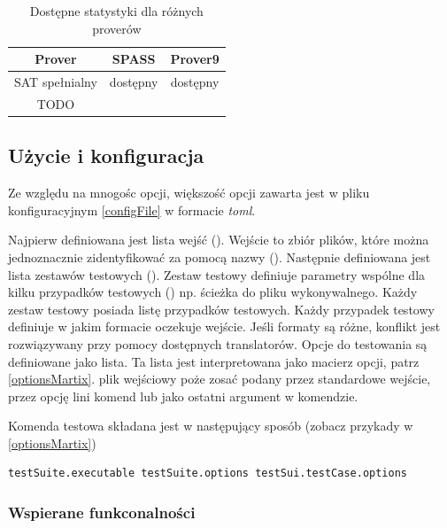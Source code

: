 \documentclass[a4paper,12pt]{article}
\begin{document}
\begin{table}[ht]
  \centering
  \caption{Dostępne statystyki dla różnych proverów}
  \begin{tabular}{ |c|c|c| }
    \hline
    Prover & SPASS & Prover9 \\
    \hline
    SAT spełnialny & dostępny & dostępny \\
    \hline
    TODO & & \\
    \hline
  \end{tabular}
\end{table}

\subsection{Użycie i konfiguracja} \label{benchmarkUsage}

Ze względu na mnogośc opcji, większość opcji zawarta jest w pliku konfiguracyjnym \ref{configFile} w formacie \textit{toml}.

Najpierw definiowana jest lista wejść (). Wejście to zbiór plików, które można jednoznacznie zidentyfikować za pomocą nazwy ().
Następnie definiowana jest lista zestawów testowych (). Zestaw testowy definiuje parametry wspólne dla kilku przypadków testowych () np. ścieżka do pliku wykonywalnego. Każdy zestaw testowy posiada listę przypadków testowych. Każdy przypadek testowy definiuje w jakim formacie oczekuje wejście. Jeśli formaty są różne, konflikt jest rozwiązywany przy pomocy dostępnych translatorów. Opcje do testowania są definiowane jako lista. Ta lista jest interpretowana jako macierz opcji, patrz \ref{optionsMartix}. plik wejściowy poże zosać podany przez standardowe wejście, przez opcję lini komend lub jako ostatni argument w komendzie.

Komenda testowa składana jest w następujący sposób (zobacz przykady w \ref{optionsMartix})

\begin{verbatim}
testSuite.executable testSuite.options testSui.testCase.options
\end{verbatim}

\subsubsection{Wspierane funkconalności}
\end{document}
